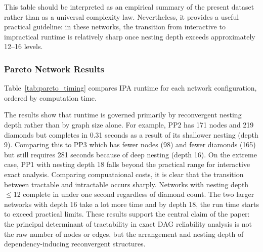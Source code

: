 \documentclass[preprint,12pt]{elsarticle}
\begin{document}
This table should be interpreted as an empirical summary of the present dataset rather than as a universal complexity law. Nevertheless, it provides a useful practical guideline: in these networks, the transition from interactive to impractical runtime is relatively sharp once nesting depth exceeds approximately 12--16 levels.


\subsubsection{Pareto Network Results}

Table~\ref{tab:pareto_timing} compares IPA runtime for each network configuration, ordered by computation time.

\begin{table}[ht]
\caption{IPA runtime across Pareto-optimal drone network configurations.}
\label{tab:pareto_timing}
\centering
{}
\end{table}

The results show that runtime is governed primarily by reconvergent nesting depth rather than by graph size alone.  For example, PP2 has 171 nodes and 219 diamonds but completes in 0.31 seconds as a result of its  shallower nesting (depth 9). Comparing this to PP3 which  has fewer nodes (98) and fewer diamonds (165) but still requires 281 seconds because of deep nesting (depth 16). On the extreme case, PP1 with nesting depth 18  falls beyond the practical range for interactive exact analysis. 
Comparing compuataional costs, it is clear that the transition between tractable and intractable  occurs sharply. Networks with nesting depth $\leq$12 complete in under one second regardless of diamond count. The two larger networks with depth 16 take a lot more time and by depth 18, the run time starts to exceed practical limits. These results support the central claim of the paper: the principal determinant of tractability in exact DAG reliability analysis is not the raw number of nodes or edges, but the arrangement and nesting depth of dependency-inducing reconvergent structures.
\end{document}
